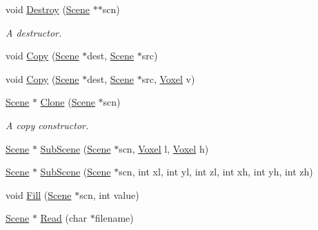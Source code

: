 \begin{DoxyCompactItemize}
void \hyperlink{namespacegft_1_1Scene_ad9ec15e00a190b1f35e8cfc53afd0bbd}{Destroy} (\hyperlink{namespacegft_1_1Scene_a9c4af0354661c7f13881605f34dd4f52}{Scene} $\ast$$\ast$scn)
\begin{DoxyCompactList}\small\item\em A destructor. \end{DoxyCompactList}\item 
void \hyperlink{namespacegft_1_1Scene_aea7ad82e577497b805f962e0c126139a}{Copy} (\hyperlink{namespacegft_1_1Scene_a9c4af0354661c7f13881605f34dd4f52}{Scene} $\ast$dest, \hyperlink{namespacegft_1_1Scene_a9c4af0354661c7f13881605f34dd4f52}{Scene} $\ast$src)
\item 
void \hyperlink{namespacegft_1_1Scene_afc10acf641c2a9526cb2cad36f6d2e79}{Copy} (\hyperlink{namespacegft_1_1Scene_a9c4af0354661c7f13881605f34dd4f52}{Scene} $\ast$dest, \hyperlink{namespacegft_1_1Scene_a9c4af0354661c7f13881605f34dd4f52}{Scene} $\ast$src, \hyperlink{namespacegft_a16db894075bb714f877a3c5733772db6}{Voxel} v)
\item 
\hyperlink{namespacegft_1_1Scene_a9c4af0354661c7f13881605f34dd4f52}{Scene} $\ast$ \hyperlink{namespacegft_1_1Scene_aa5dcd674b11adac320386610cad0980f}{Clone} (\hyperlink{namespacegft_1_1Scene_a9c4af0354661c7f13881605f34dd4f52}{Scene} $\ast$scn)
\begin{DoxyCompactList}\small\item\em A copy constructor. \end{DoxyCompactList}\item 
\hyperlink{namespacegft_1_1Scene_a9c4af0354661c7f13881605f34dd4f52}{Scene} $\ast$ \hyperlink{namespacegft_1_1Scene_a6756ed0748d7d3ae175388c4b8b90df2}{Sub\-Scene} (\hyperlink{namespacegft_1_1Scene_a9c4af0354661c7f13881605f34dd4f52}{Scene} $\ast$scn, \hyperlink{namespacegft_a16db894075bb714f877a3c5733772db6}{Voxel} l, \hyperlink{namespacegft_a16db894075bb714f877a3c5733772db6}{Voxel} h)
\item 
\hyperlink{namespacegft_1_1Scene_a9c4af0354661c7f13881605f34dd4f52}{Scene} $\ast$ \hyperlink{namespacegft_1_1Scene_ab8953397b3629656300f693ae8c1c5f7}{Sub\-Scene} (\hyperlink{namespacegft_1_1Scene_a9c4af0354661c7f13881605f34dd4f52}{Scene} $\ast$scn, int xl, int yl, int zl, int xh, int yh, int zh)
\item 
void \hyperlink{namespacegft_1_1Scene_acc0927bf3f6df0c9cb0229ac819e9291}{Fill} (\hyperlink{namespacegft_1_1Scene_a9c4af0354661c7f13881605f34dd4f52}{Scene} $\ast$scn, int value)
\item 
\hyperlink{namespacegft_1_1Scene_a9c4af0354661c7f13881605f34dd4f52}{Scene} $\ast$ \hyperlink{namespacegft_1_1Scene_aae0181a5c26a93d98805b2ed61c41046}{Read} (char $\ast$filename)
$$
\end{DoxyCompactItemize}
